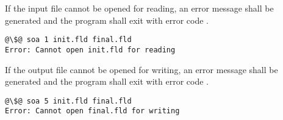 If the input file cannot be opened for reading, an error message shall be
generated and the program shall exit with error code .

\begin{lstlisting}[style=terminal,escapechar=@]
@\$@ soa 1 init.fld final.fld
Error: Cannot open init.fld for reading
\end{lstlisting}

If the output file cannot be opened for writing, an error message shall be
generated and the program shall exit with error code .

\begin{lstlisting}[style=terminal,escapechar=@]
@\$@ soa 5 init.fld final.fld
Error: Cannot open final.fld for writing
\end{lstlisting}
